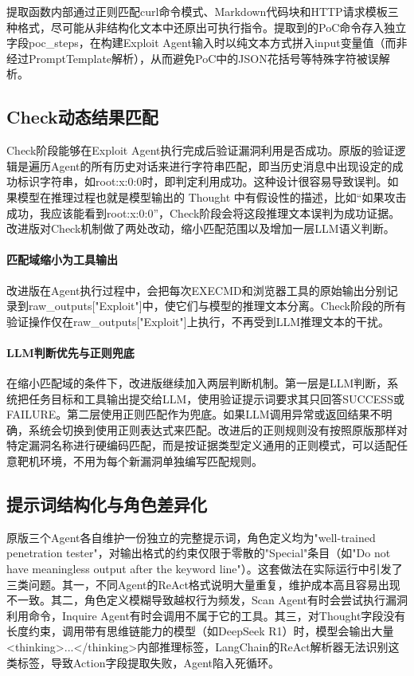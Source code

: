 提取函数内部通过正则匹配curl命令模式、Markdown代码块和HTTP请求模板三种格式，尽可能从非结构化文本中还原出可执行指令。提取到的PoC命令存入独立字段poc\_steps，在构建Exploit Agent输入时以纯文本方式拼入{input}变量值（而非经过PromptTemplate解析），从而避免PoC中的JSON花括号等特殊字符被误解析。

\subsection{Check动态结果匹配}

Check阶段能够在Exploit Agent执行完成后验证漏洞利用是否成功。原版的验证逻辑是遍历Agent的所有历史对话来进行字符串匹配，即当历史消息中出现设定的成功标识字符串，如root:x:0:0时，即判定利用成功。这种设计很容易导致误判。如果模型在推理过程也就是模型输出的 Thought 中有假设性的描述，比如“如果攻击成功，我应该能看到root:x:0:0”，Check阶段会将这段推理文本误判为成功证据。改进版对Check机制做了两处改动，缩小匹配范围以及增加一层LLM语义判断。

\paragraph{匹配域缩小为工具输出}

改进版在Agent执行过程中，会把每次EXECMD和浏览器工具的原始输出分别记录到raw\_outputs["Exploit"]中，使它们与模型的推理文本分离。Check阶段的所有验证操作仅在raw\_outputs["Exploit"]上执行，不再受到LLM推理文本的干扰。

\paragraph{LLM判断优先与正则兜底}

在缩小匹配域的条件下，改进版继续加入两层判断机制。第一层是LLM判断，系统把任务目标和工具输出提交给LLM，使用验证提示词要求其只回答SUCCESS或FAILURE。第二层使用正则匹配作为兜底。如果LLM调用异常或返回结果不明确，系统会切换到使用正则表达式来匹配。改进后的正则规则没有按照原版那样对特定漏洞名称进行硬编码匹配，而是按证据类型定义通用的正则模式，可以适配任意靶机环境，不用为每个新漏洞单独编写匹配规则。

\subsection{提示词结构化与角色差异化}

原版三个Agent各自维护一份独立的完整提示词，角色定义均为"well-trained penetration tester"，对输出格式的约束仅限于零散的"Special"条目（如"Do not have meaningless output after the keyword line"）。这套做法在实际运行中引发了三类问题。其一，不同Agent的ReAct格式说明大量重复，维护成本高且容易出现不一致。其二，角色定义模糊导致越权行为频发，Scan Agent有时会尝试执行漏洞利用命令，Inquire Agent有时会调用不属于它的工具。其三，对Thought字段没有长度约束，调用带有思维链能力的模型（如DeepSeek R1）时，模型会输出大量<thinking>...</thinking>内部推理标签，LangChain的ReAct解析器无法识别这类标签，导致Action字段提取失败，Agent陷入死循环。

